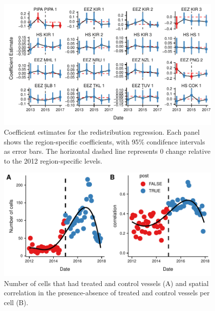 \documentclass[9pttwoside,lineno]{pnas-new}
\begin{document}
\begin{figure}
\centering
\includegraphics{img/mean_change.pdf}
\caption{\label{fig:mean_change}Coefficient
estimates for the redistribution regression. Each panel shows the
region-specific coefficients, with 95\% condifence intervals
as error bars. The horizontal dashed line represents 0 change
relative to the 2012 region-specific levels.}
\end{figure}

\clearpage
\begin{landscape}



\end{landscape}
\clearpage

\begin{figure}
\centering
\includegraphics{img/sp_corr.pdf}
\caption{\label{fig:sp_corr}Number of cells that
had treated and control vessels (A) and spatial correlation in the
presence-absence of treated and control vessels per cell (B).}
\end{figure}


\end{document}
